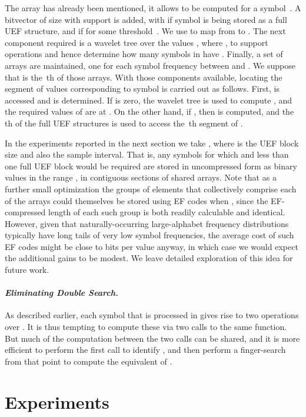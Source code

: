 \documentclass{llncs}
\newcommand{\myparagraph}[1]{\paragraph*{\normalsize\it#1.}}
\begin{document}
The array  has already been mentioned, it allows  to be
computed for a symbol~.
A bitvector  of size  with  support is
added, with  if symbol  is being stored as a full UEF
structure, and  if  for some threshold~. We use
 to map from  to .
The next component required is a wavelet tree over the values ,
where , to support  operations and hence
determine how many symbols  in  have .
Finally, a set of  arrays are maintained, one for each symbol
frequency between  and .
We suppose that  is the \,th of those arrays.
With those components available, locating the segment of 
values corresponding to symbol  is carried out as follows.
First,  is accessed and  is determined.
If  is zero, the wavelet tree is used to compute , and the  required values
of  are at .
On the other hand, if , then  is computed,
and the \,th of the full UEF structures is used to access the
\,th segment of .

In the experiments reported in the next section we take , where
 is the UEF block size and also the sample interval.
That is, any symbols  for which  and less than one full
UEF block would be required are stored in uncompressed form as binary
values in the range , in contiguous sections of shared
arrays.
Note that as a further small optimization the groups of 
elements that collectively comprise each of the arrays 
could themselves be stored using EF codes when , since the
EF-compressed length of each such group is both readily calculable
and identical.
However, given that naturally-occurring large-alphabet frequency
distributions typically have long tails of very low symbol
frequencies, the average cost of such EF codes might be close to
 bits per  value anyway, in which case we
would expect the additional gains to be modest.
We leave detailed exploration of this idea for future work.

\myparagraph{Eliminating Double Search}

As described earlier, each symbol that is processed in  gives
rise to two  operations over .
It is thus tempting to compute these via two calls to the same
function.
But much of the computation between the two calls can be shared, and
it is more efficient to perform the first  call to identify
, and then perform a finger-search from that point
to compute the equivalent of .

\section{Experiments}
\label{sec-experiments}
\end{document}

